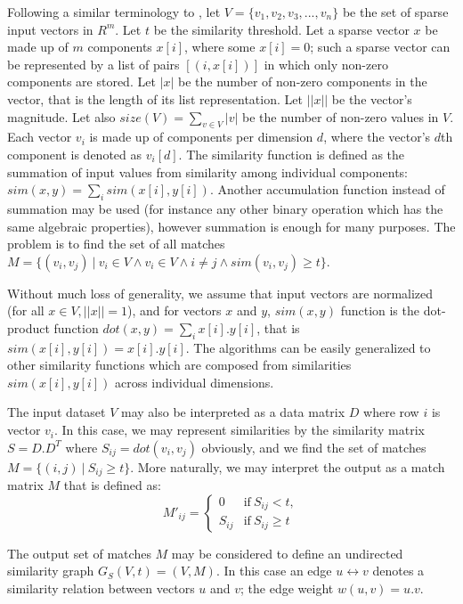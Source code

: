 \documentclass{comjnl}
\begin{document}
Following a similar terminology to \cite{Bayardo2007Scaling}, let $V =
\{ v_1, v_2, v_3, ..., v_n\}$ be the set of sparse input vectors in
$R^m$. Let $t$ be the similarity threshold.  Let a sparse vector $x$
be made up of $m$ components $x[i]$, where some $x[i]=0$; such a
sparse vector can be represented by a list of pairs $\left[(i, x[i])
\right]$ in which only non-zero components are stored.  Let $|x|$ be
the number of non-zero components in the vector, that is the length of
its list representation.  Let $||x||$ be the vector's magnitude. Let
also $size(V)=\sum_{v \in V}|v|$ be the number of non-zero values in
$V$.  Each vector $v_i$ is made up of components per dimension $d$,
where the vector's $d$th component is denoted as $v_i[d]$. The
similarity function is defined as the summation of input values from
similarity among individual components:
$sim(x,y)=\sum_{i}sim(x[i],y[i])$. Another accumulation function
instead of summation may be used (for instance any other binary
operation which has the same algebraic properties), however summation
is enough for many purposes.  The problem is to find the set of all
matches $M=\{ (v_i,v_j) \ |\ {v_i \in V} \land {v_i \in V} \land {i \neq j}
\land {sim(v_i,v_j) \geq t} \}$.

Without much loss of generality, we assume that input vectors are
normalized (for all $x \in V, ||x||=1$), and for vectors $x$ and $y$,
$sim(x,y)$ function is the dot-product function $dot(x,y) =
\sum_{i}x[i] . y[i]$, that is $sim(x[i],y[i])=x[i].y[i]$. The
algorithms can be easily generalized to other similarity functions
which are composed from similarities $sim(x[i], y[i])$ across
individual dimensions.  

The input dataset $V$ may also be interpreted as a data matrix $D$
where row $i$ is vector $v_i$. In this case, we may represent
similarities by the similarity matrix $S = D.D^T$ where
$S_{ij}=dot(v_i,v_j)$ obviously, and we find the set of matches $M =
\{(i,j) \ |\ S_{ij} \geq t \}$. More naturally, we may interpret the
output as a match matrix $M$ that is defined as:
\begin{equation}
  M'_{ij} = 
  \begin{cases}
    0 & \text{if} \ S_{ij} < t, \\
    S_{ij} & \text{if} \ S_{ij} \geq t
  \end{cases}
\end{equation}

The output set of matches $M$ may be considered to define an
undirected similarity graph $G_S(V, t) = (V, M)$. In this case an edge
$ u \leftrightarrow v$ denotes a similarity relation between vectors
$u$ and $v$; the edge weight $w(u,v) = u.v$. 
\end{document}

